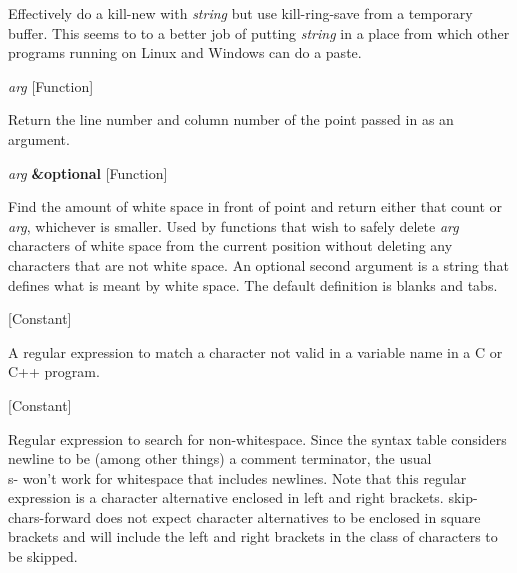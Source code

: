 \begin{doc-string}
Effectively do a kill-new with \emph{string} but use kill-ring-save from
a temporary buffer.  This seems to to a better job of putting \emph{string}
in a place from which other programs running on Linux and Windows can
do a paste.
\end{doc-string}

\vspace{1em}
\noindent
{}
\usebox{\funcname}\emph{arg}
 \hfill [Function]

\begin{doc-string}
Return the line number and column number of the point passed in as an argument.
\end{doc-string}

\vspace{1em}
\noindent
{}
\usebox{\funcname}\emph{arg} \textbf{\&optional}
 \hfill [Function]
\hspace*{\wd\funcname}

\begin{doc-string}
Find the amount of white space in front of point and return either that
count or \emph{arg}, whichever is smaller.  Used by functions that wish to
safely delete \emph{arg} characters of white space from the current position
without deleting any characters that are not white space.
An optional second argument is a string that defines what is meant
by white space.  The default definition is blanks and tabs.
\end{doc-string}

\vspace{1em}
\noindent
{}
\usebox{\funcname}
 \hfill [Constant]

\begin{doc-string}
A regular expression to match a character not valid in a variable name
in a C or C++ program.
\end{doc-string}

\vspace{1em}
\noindent
{}
\usebox{\funcname}
 \hfill [Constant]

\begin{doc-string}
Regular expression to search for non-whitespace.  Since the syntax table considers
newline to be (among other things) a comment terminator, the usual \\s- won't work
for whitespace that includes newlines.  Note that this regular expression is a
character alternative enclosed in left and right brackets.  skip-chars-forward does
not expect character alternatives to be enclosed in square brackets and will include
the left and right brackets in the class of characters to be skipped.
\end{doc-string}

